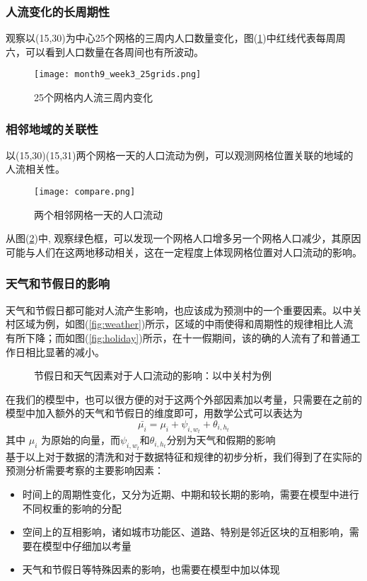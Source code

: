 \subsubsection*{人流变化的长周期性}
观察以(15,30)为中心25个网格的三周内人口数量变化，图(\ref{fig:2.3})中红线代表每周周六，可以看到人口数量在各周间也有所波动。
\begin{figure}[ht]
\centering
\texttt{[image: month9\_week3\_25grids.png]}
\caption{25个网格内人流三周内变化}
\label{fig:2.3}
\end{figure}
\subsubsection*{相邻地域的关联性}
以(15,30)(15,31)两个网格一天的人口流动为例，可以观测网格位置关联的地域的人流相关性。
\begin{figure}[ht]
\centering
\texttt{[image: compare.png]}
\caption{两个相邻网格一天的人口流动}
\label{fig:2.4}
\end{figure}
从图(\ref{fig:2.4})中,
观察绿色框，可以发现一个网格人口增多另一个网格人口减少，其原因可能与人们在这两地移动相关，这在一定程度上体现网格位置对人口流动的影响。
\subsubsection*{天气和节假日的影响}
天气和节假日都可能对人流产生影响，也应该成为预测中的一个重要因素。以中关村区域为例，如图(\ref{fig:weather})所示，区域的中雨使得和周期性的规律相比人流有所下降；而如图(\ref{fig:holiday})所示，在十一假期间，该的确的人流有了和普通工作日相比显著的减小。
\begin{figure}[ht]
\centering
{}
\hfill
\caption{节假日和天气因素对于人口流动的影响：以中关村为例}
\end{figure}
在我们的模型中，也可以很方便的对于这两个外部因素加以考量，只需要在之前的模型中加入额外的天气和节假日的维度即可，用数学公式可以表达为
\begin{equation}
\bar{\mu_i} = \mu_i + \psi_{i,w_t}+\theta_{i,h_t}
\end{equation}
其中 $\mu_i$ 为原始的向量，而$\psi_{i,w_t}$和$\theta_{i,h_t}$分别为天气和假期的影响
\\
基于以上对于数据的清洗和对于数据特征和规律的初步分析，我们得到了在实际的预测分析需要考察的主要影响因素：
\begin{itemize}
	\item 时间上的周期性变化，又分为近期、中期和较长期的影响，需要在模型中进行不同权重的影响的分配
	\item 空间上的互相影响，诸如城市功能区、道路、特别是邻近区块的互相影响，需要在模型中仔细加以考量
	\item 天气和节假日等特殊因素的影响，也需要在模型中加以体现
\end{itemize}
